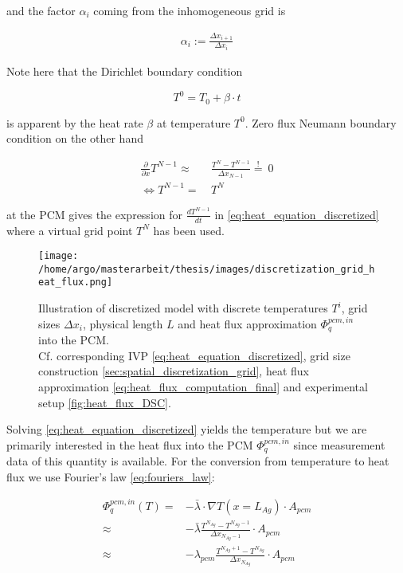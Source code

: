 \documentclass{scrartcl}[12pt, halfparskip]
\numberwithin{equation}{section}
\numberwithin{figure}{section}
\numberwithin{table}{section}
\begin{document}
and the factor $\alpha_i$ coming from the inhomogeneous grid is

\begin{align}
	\alpha_i := \frac{\Delta x_{i+1}}{\Delta x_{i}}
\end{align}


Note here that the Dirichlet boundary condition 

\begin{equation}
	T^0 = T_0 + \beta \cdot t
\end{equation}



is apparent by the heat rate $\beta$ at temperature $T^0$. Zero flux Neumann boundary condition on the other hand

\begin{align}
	\frac{\partial}{\partial x} T^{N-1} \approx & \ \frac{T^N - T^{N-1}}{\Delta x_{N-1}} \stackrel{!}{=} \ 0 \\
	\Leftrightarrow T^{N-1} = & \ T^N \nonumber 
\end{align}



 at the PCM gives the expression for $\frac{d T^{N-1}}{dt}$ in \cref{eq:heat_equation_discretized} where a virtual grid point $T^N$ has been used.

\begin{figure}[H]
	\centering
	\texttt{[image: /home/argo/masterarbeit/thesis/images/discretization\_grid\_heat\_flux.png]}
	\caption{Illustration of discretized model with discrete temperatures $T^i$, grid sizes $\Delta x_i$, physical length $L$ and heat flux approximation $\varPhi_q^{pcm,in}$ into the PCM. \\
	Cf.	corresponding IVP \cref{eq:heat_equation_discretized}, grid size construction \cref{sec:spatial_discretization_grid}, heat flux approximation \cref{eq:heat_flux_computation_final} and experimental setup \cref{fig:heat_flux_DSC}.}
	\label{fig:mathematical_model_discretized}
\end{figure}


Solving \cref{eq:heat_equation_discretized} yields the temperature but we are primarily interested in the heat flux into the PCM $\varPhi_{q}^{pcm,in}$ since measurement data of this quantity is available. For the conversion from temperature to heat flux we use Fourier's law \cref{eq:fouriers_law}:

\begin{align}
	\varPhi_{q}^{pcm,in}(T) = & - \bar{\lambda} \cdot \nabla T (x=L_{Ag}) \cdot A_{pcm} \\
	\approx & - \bar{\lambda} \frac{T^{N_{Ag}} - T^{N_{Ag}-1}}{\Delta x_{N_{Ag}-1}} \cdot A_{pcm} \nonumber \\
	\approx & - \lambda_{pcm} \frac{T^{N_{Ag}+1} - T^{N_{Ag}}}{\Delta x_{N_{Ag}}} \cdot A_{pcm} \nonumber
\end{align}
\end{document}
